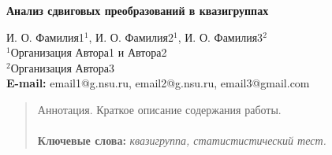 \documentclass[a4paper,12pt]{article}
\def\titleK#1{\begin{center}{\textbf {#1}}\end{center}}
\def\authorK#1{\begin{center}{#1}\end{center}}
\newtheorem{lemma}{Лемма}
\newtheorem{theorem}{Теорема}
\newtheorem{corollary}{Следствие}
\newtheorem{proposition}{Предложение}
\theoremstyle{definition}
\newtheorem{definition}{Определение}
\theoremstyle{definition}
\newtheorem{question}{Вопрос}
\theoremstyle{definition}
\newtheorem{conjecture}{Гипотеза}
\begin{document}
\titleK{Анализ сдвиговых преобразований в квазигруппах}
\authorK{И. О. Фамилия1$^{1}$, И. О. Фамилия2$^{1}$, И. О. Фамилия3$^{2}$\\
$^{1}$Организация Автора1 и Автора2 \\ $^{2}$Организация Автора3 \\ {\bf E-mail:} email1@g.nsu.ru, email2@g.nsu.ru, email3@gmail.com}
\begin{abstract}
      Аннотация. Краткое описание содержания работы. \\
\\{\bf Ключевые слова:} \textit{ квазигруппа, статистистический тест.} 
 \end{abstract}
\end{document}
